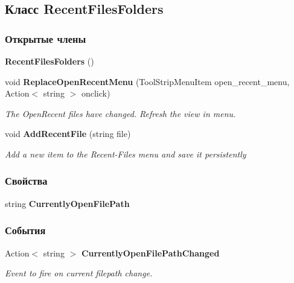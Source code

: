 \subsection{Класс Recent\+Files\+Folders}
\label{classkdz__manager_1_1_recent_files_folders}
\subsubsection*{Открытые члены}
\begin{DoxyCompactItemize}
\item 
{\bf Recent\+Files\+Folders} ()
\item 
void {\bf Replace\+Open\+Recent\+Menu} (Tool\+Strip\+Menu\+Item open\+\_\+recent\+\_\+menu, Action$<$ string $>$ onclick)
\begin{DoxyCompactList}\small\item\em The Open\+Recent files have changed. Refresh the view in menu. \end{DoxyCompactList}\item 
void {\bf Add\+Recent\+File} (string file)
\begin{DoxyCompactList}\small\item\em Add a new item to the Recent-\/\+Files menu and save it persistently \end{DoxyCompactList}\end{DoxyCompactItemize}
\subsubsection*{Свойства}
\begin{DoxyCompactItemize}
\item 
string {\bfseries Currently\+Open\+File\+Path}\hspace{0.3cm}{\ttfamily  [get, set]}\label{classkdz__manager_1_1_recent_files_folders_a69ecdef3984e3864eec1ad459bc98161}

\end{DoxyCompactItemize}
\subsubsection*{События}
\begin{DoxyCompactItemize}
\item 
Action$<$ string $>$ {\bf Currently\+Open\+File\+Path\+Changed}
\begin{DoxyCompactList}\small\item\em Event to fire on current filepath change. \end{DoxyCompactList}\end{DoxyCompactItemize}


